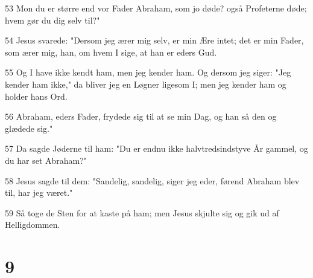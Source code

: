 \par 53 Mon du er større end vor Fader Abraham, som jo døde? også Profeterne døde; hvem gør du dig selv til?"
\par 54 Jesus svarede: "Dersom jeg ærer mig selv, er min Ære intet; det er min Fader, som ærer mig, han, om hvem I sige, at han er eders Gud.
\par 55 Og I have ikke kendt ham, men jeg kender ham. Og dersom jeg siger: "Jeg kender ham ikke," da bliver jeg en Løgner ligesom I; men jeg kender ham og holder hans Ord.
\par 56 Abraham, eders Fader, frydede sig til at se min Dag, og han så den og glædede sig."
\par 57 Da sagde Jøderne til ham: "Du er endnu ikke halvtredsindstyve År gammel, og du har set Abraham?"
\par 58 Jesus sagde til dem: "Sandelig, sandelig, siger jeg eder, førend Abraham blev til, har jeg været."
\par 59 Så toge de Sten for at kaste på ham; men Jesus skjulte sig og gik ud af Helligdommen.

\chapter{9}

